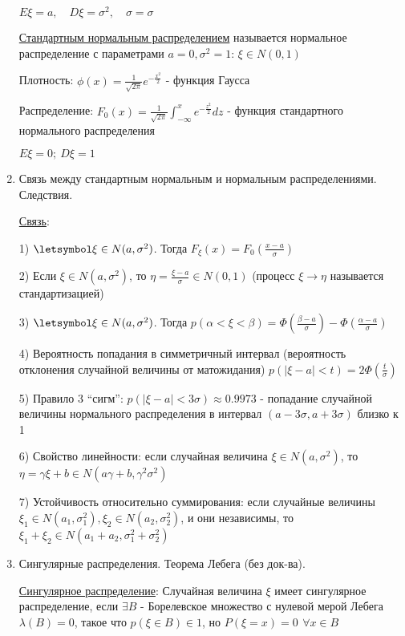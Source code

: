 \begin{enumerate}
    $E\xi = a, \quad D\xi = \sigma^2, \quad \sigma = \sigma$

    \hyperlink{standardnormaldistribution}{Стандартным нормальным распределением} называется нормальное распределение с параметрами $a = 0, \sigma^2 = 1$: $\xi \in N(0, 1)$

    Плотность: $\phi(x) = \frac{1}{\sqrt{2\pi}} e^{-\frac{x^2}{2}}$ - функция Гаусса

    Распределение: $F_0(x) = \frac{1}{\sqrt{2\pi}} \int_{-\infty}^x e^{-\frac{z^2}{2}} dz$ - функция стандартного нормального распределения

    $E\xi = 0; \ D\xi = 1$

    \item Связь между стандартным нормальным и нормальным распределениями. Следствия.

    \hyperlink{connectionbetweennormalandstandard}{Связь}: 

    1) $\letsymbol \xi \in N(a, \sigma^2)$. Тогда $F_\xi(x) = F_0\left(\frac{x - a}{\sigma}\right)$

    2) Если $\xi \in N(a, \sigma^2)$, то $\eta = \frac{\xi - a}{\sigma} \in N(0, 1)$ (процесс $\xi \to \eta$ называется стандартизацией)

    3) $\letsymbol \xi \in N(a, \sigma^2)$. Тогда $p(\alpha < \xi < \beta) = \Phi\left(\frac{\beta - a}{\sigma}\right) - \Phi\left(\frac{\alpha - a}{\sigma}\right)$

    4) Вероятность попадания в симметричный интервал (вероятность отклонения случайной величины от матожидания) 
    $p(|\xi - a| < t) = 2\Phi\left(\frac{t}{\sigma}\right)$

    5) Правило 3 \enquote{сигм}: $p(|\xi - a| < 3\sigma) \approx 0.9973$ - попадание случайной величины нормального распределения в интервал $(a - 3\sigma, a + 3\sigma)$ близко к 1

    6) Свойство линейности: если случайная величина $\xi \in N(a, \sigma^2)$, то $\eta = \gamma \xi + b \in N(a \gamma + b, \gamma^2 \sigma^2)$ 
    
    7) Устойчивость относительно суммирования: если случайные величины $\xi_1 \in N(a_1, \sigma_1^2), \xi_2 \in N(a_2, \sigma_2^2)$, и они независимы, то $\xi_1 + \xi_2 \in N(a_1 + a_2, \sigma^2_1 + \sigma^2_2)$

    
    \item Сингулярные распределения. Теорема Лебега (без док-ва).

    \hyperlink{singulardistribution}{Сингулярное распределение}: Случайная величина $\xi$ имеет сингулярное распределение, если $\exists B$ - Борелевское множество с нулевой мерой Лебега $\lambda(B) = 0$, такое что $p(\xi \in B) \in 1$, но $P(\xi = x) = 0 \ \, \forall x \in B$


\end{enumerate}
